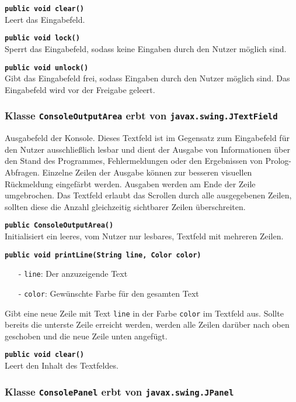 \documentclass[parskip=full,11pt,twoside]{scrartcl}
\begin{document}
\textbf{\texttt{public void clear()}}\\
Leert das Eingabefeld.

\textbf{\texttt{public void lock()}}\\
Sperrt das Eingabefeld, sodass keine Eingaben durch den Nutzer möglich sind.

\textbf{\texttt{public void unlock()}}\\
Gibt das Eingabefeld frei, sodass Eingaben durch den Nutzer möglich sind. Das Eingabefeld wird vor der Freigabe geleert.

\subsubsection{Klasse \texttt{ConsoleOutputArea} erbt von \texttt{javax.swing.JTextField}}

Ausgabefeld der Konsole. Dieses Textfeld ist im Gegensatz zum Eingabefeld für den Nutzer ausschließlich lesbar und dient der Ausgabe von Informationen über den Stand des Programmes, Fehlermeldungen oder den Ergebnissen von Prolog-Abfragen. Einzelne Zeilen der Ausgabe können zur besseren visuellen Rückmeldung eingefärbt werden. Ausgaben werden am Ende der Zeile umgebrochen. Das Textfeld erlaubt das Scrollen durch alle ausgegebenen Zeilen, sollten diese die Anzahl gleichzeitig sichtbarer Zeilen überschreiten.

\textbf{\texttt{public ConsoleOutputArea()}}\\
Initialisiert ein leeres, vom Nutzer nur lesbares, Textfeld mit mehreren Zeilen.

\textbf{\texttt{public void printLine(String line, Color color)}}
\begin{itemize}[noitemsep]
	\item[-] \texttt{line}: Der anzuzeigende Text
	\item[-] \texttt{color}: Gewünschte Farbe für den gesamten Text
\end{itemize}
Gibt eine neue Zeile mit Text \texttt{line} in der Farbe \texttt{color} im Textfeld aus. Sollte bereits die unterste Zeile erreicht werden, werden alle Zeilen darüber nach oben geschoben und die neue Zeile unten angefügt.

\textbf{\texttt{public void clear()}}\\
Leert den Inhalt des Textfeldes.

\subsubsection{Klasse \texttt{ConsolePanel} erbt von \texttt{javax.swing.JPanel}}
\end{document}
